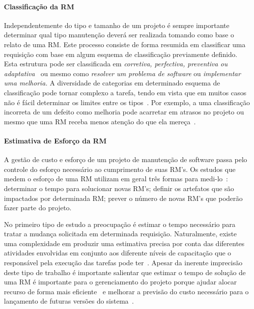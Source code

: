 \paragraph{Classificação da RM} Independentemente do tipo e tamanho de um
projeto é sempre importante determinar qual tipo manutenção deverá ser realizada
tomando como base o relato de uma RM\@.  Este processo consiste de forma
resumida em classificar uma requisição com base em algum esquema de
classificação previamente definido. Esta estrutura pode ser classificada em
\textit{corretiva, perfectiva, preventiva ou adaptativa}~\cite{4425813} ou mesmo
como \textit{resolver um problema de software} ou \textit{implementar uma
	melhoria.} A diversidade de categorias em determinado esquema de
classificação pode tornar complexo a tarefa, tendo em vista que em muitos casos
não é fácil determinar os limites entre os tipos~\cite{antoniol2008bug}. Por
exemplo, a uma classificação incorreta de um defeito como melhoria pode
acarretar em atrasos no projeto ou mesmo que uma RM receba menos atenção
do que ela mereça~\cite{cavalcanti2014challenges}.

\paragraph{Estimativa de Esforço da RM} A gestão de custo e esforço de um
projeto de manutenção de software passa pelo controle do esforço necessário ao
cumprimento de suas RM's. Os estudos que medem o esforço de uma RM utilizam em
geral três formas para medi-lo~\cite{cavalcanti2014challenges}:
determinar o tempo para solucionar novas RM's; definir os artefatos que são
impactados por determinada RM\@; prever o número de novas RM's que poderão fazer
parte do projeto.

No primeiro tipo de estudo a preocupação é estimar o tempo necessário para
tratar a mudança solicitada em determinada requisição. Naturalmente, existe uma
complexidade em produzir uma estimativa precisa por conta das diferentes
atividades envolvidas em conjunto aos diferente níveis de capacitação que o
responsável pela execução das tarefas pode ter~\cite{xia2015automatic}.  Apesar
da inerente imprecisão deste tipo de trabalho é importante salientar que estimar
o tempo de solução de uma RM é importante para o gerenciamento do projeto porque
ajudar alocar recurso de forma mais
eficiente~\cite{Bhattacharya:2011:BTP:1985441.1985472} e melhorar a previsão do
custo necessário para o lançamento de futuras versões do
sistema~\cite{Vijayakumar2014}.

